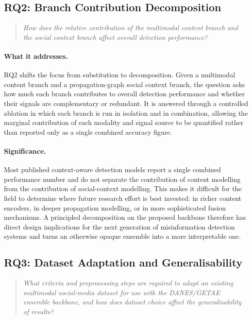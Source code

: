 \subsection*{RQ2: Branch Contribution Decomposition}
\label{subsec:rq2}

\begin{quote}
\emph{How does the relative contribution of the multimodal content
branch and the social context branch affect overall detection
performance?}
\end{quote}

\paragraph{What it addresses.}
RQ2 shifts the focus from substitution to decomposition. Given a
multimodal content branch and a propagation-graph social context
branch, the question asks how much each branch contributes to overall
detection performance and whether their signals are complementary or
redundant. It is answered through a controlled ablation in which each
branch is run in isolation and in combination, allowing the marginal
contribution of each modality and signal source to be quantified
rather than reported only as a single combined accuracy figure.

\paragraph{Significance.}
Most published context-aware detection models report a single combined
performance number and do not separate the contribution of content
modelling from the contribution of social-context modelling. This
makes it difficult for the field to determine where future research
effort is best invested: in richer content encoders, in deeper
propagation modelling, or in more sophisticated fusion mechanisms.
A principled decomposition on the proposed backbone therefore has
direct design implications for the next generation of misinformation
detection systems and turns an otherwise opaque ensemble into a more
interpretable one.

\subsection*{RQ3: Dataset Adaptation and Generalisability}
\label{subsec:rq3}

\begin{quote}
\emph{What criteria and preprocessing steps are required to adapt an
existing multimodal social-media dataset for use with the DANES/GETAE
ensemble backbone, and how does dataset choice affect the
generalisability of results?}
\end{quote}

